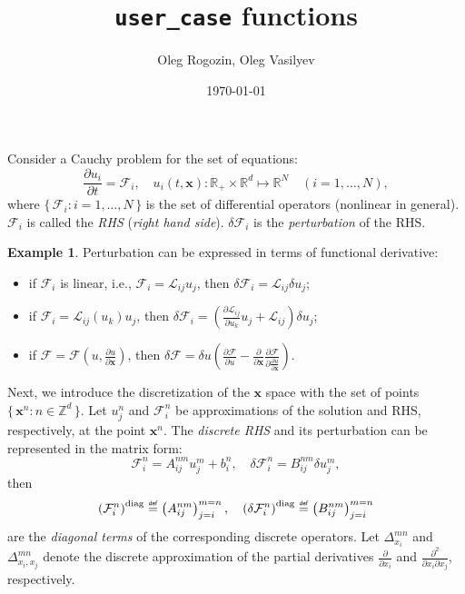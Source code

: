 \documentclass{article}
\title{\texttt{user\_case} functions}
\date{\today}
\author{Oleg Rogozin, Oleg Vasilyev}
\newcommand{\pert}[1]{\delta#1}
\newcommand{\pder}[2][]{\frac{\partial#1}{\partial#2}}      %
\newcommand{\dder}[1]{\Delta_{#1}}                          %
\newcommand{\vder}[2][]{\frac{\pert#1}{\pert#2}}            %
\newcommand{\pderder}[3][]{\frac{\partial^2#1}{\partial#2\partial#3}}
\newcommand{\LL}{\mathcal{L}}
\newcommand{\FF}{\mathcal{F}}
\newcommand{\bx}{\mathbf x}
\newcommand{\diag}[1]{\left(#1\right)^\mathrm{diag}}
\newcommand{\Set}[2]{\{\,{#1}:{#2}\,\}}
\newcommand{\eqdef}{\mathrel{\overset{\makebox[0pt]{\mbox{\normalfont\tiny\sffamily def}}}{=}}}
\theoremstyle{definition}
\newtheorem{example}{Example}
\begin{document}
\maketitle

Consider a Cauchy problem for the set of equations:
\begin{equation}\label{eq:problem}
    \pder[u_i]{t} = \FF_i, \quad
    u_i(t,\bx): \mathbb{R}_+\times\mathbb{R}^d\mapsto\mathbb{R}^N \quad (i=1,\dots,N),
\end{equation}
where \(\Set{\FF_i}{i=1,\dots,N}\) is the set of differential operators (nonlinear in general).
\(\FF_i\) is called the \emph{RHS} (\emph{right hand side}).
\(\pert{\FF_i}\) is the \emph{perturbation} of the RHS.
\begin{example}
Perturbation can be expressed in terms of functional derivative:
\begin{itemize}
    \item if \(\FF_i\) is linear, i.e., \(\FF_i = \LL_{ij}u_j\), then
        \(\pert{\FF_i} = \LL_{ij}\pert{u}_j\);
    \item if \(\FF_i = \LL_{ij}(u_k)u_j\), then
        \(\pert{\FF_i} = \left( \pder[\LL_{ij}]{u_k}u_j + \LL_{ij} \right)\pert{u}_j\);
    \item if \(\FF = \FF(u, \pder[u]{\bx})\), then
        \(\pert{\FF} = \pert{u}\left(\pder[\FF]{u} - \pder{\bx}\pder[\FF]{\pder[u]{\bx}}\right)\).
\end{itemize}
\end{example}
Next, we introduce the discretization of the \(\bx\) space with the set of points \(\Set{\bx^n}{n\in\mathbb{Z}^d}\).
Let \(u_j^n\) and \(\FF_i^n\) be approximations of the solution and RHS, respectively, at the point \(\bx^n\).
The \emph{discrete RHS} and its perturbation can be represented in the matrix form:
\begin{equation}\label{eq:matrix_representation}
    \FF_i^n = A_{ij}^{nm}u_j^m + b_i^n, \quad \pert{\FF_i^n} = B_{ij}^{nm}\pert{u_j^m},
\end{equation}
then
\begin{equation}\label{eq:diagonal_term}
     \diag{\FF_i^n} \eqdef \left( A_{ij}^{nm} \right)_{j=i}^{m=n}, \quad
     \diag{\pert{\FF_i^n}} \eqdef \left( B_{ij}^{nm} \right)_{j=i}^{m=n}
\end{equation}
are the \emph{diagonal terms} of the corresponding discrete operators.
Let \(\dder{x_i}^{mn}\) and \(\dder{x_i,x_j}^{mn}\) denote the discrete approximation
of the partial derivatives \(\pder{x_i}\) and \(\pderder{x_i}{x_j}\), respectively.
\end{document}
